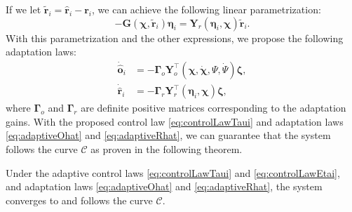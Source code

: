 If we let $\widetilde{\mathbf{r}}_i = \hat{\mathbf{r}}_i - \mathbf{r}_i$, we can achieve the following linear parametrization:
\begin{equation}
    -\mathbf{G}(\boldsymbol{\chi}, \widetilde{\mathbf{r}}_i)\boldsymbol{\eta}_i = \mathbf{Y}_r\left(\boldsymbol{\eta}_i, \boldsymbol{\chi}\right)\widetilde{\mathbf{r}}_i. \label{eq:linearParametrizationYrforEta}
\end{equation}
With this parametrization and the other expressions, we propose the following adaptation laws:
\begin{align}
    \dot{\hat{\mathbf{o}}}_i &= -\boldsymbol{\Gamma}_o\mathbf{Y}^\top_o\left(\boldsymbol{\chi},\dot{\boldsymbol{\chi}},\Psi, \dot{\Psi}\right)\boldsymbol{\zeta},  \label{eq:adaptiveOhat}\\
    \dot{\hat{\mathbf{r}}}_i &= -\boldsymbol{\Gamma}_r\mathbf{Y}^\top_r\left(\boldsymbol{\eta}_i, \boldsymbol{\chi}\right)\boldsymbol{\zeta},  \label{eq:adaptiveRhat}
\end{align}
where $\boldsymbol{\Gamma}_o$ and $\boldsymbol{\Gamma}_r$ are definite positive matrices corresponding to the adaptation gains. With the proposed control law \eqref{eq:controlLawTaui} and adaptation laws \eqref{eq:adaptiveOhat} and \eqref{eq:adaptiveRhat}, we can guarantee that the system follows the curve $\mathcal{C}$ as proven in the following theorem.
\begin{theorem}
    Under the adaptive control laws \eqref{eq:controlLawTaui} and \eqref{eq:controlLawEtai}, and adaptation laws \eqref{eq:adaptiveOhat} and \eqref{eq:adaptiveRhat}, the system converges to and follows the curve $\mathcal{C}$.
\end{theorem}
